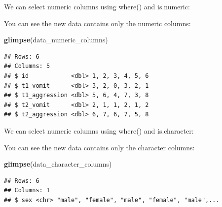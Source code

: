 \documentclass[
]{krantz}
\makeatletter
\newenvironment{Shaded}{\begin{snugshade}}{\end{snugshade}}
\newcommand{\KeywordTok}[1]{\textcolor[rgb]{0.27,0.27,0.27}{\textbf{#1}}}
\newcommand{\NormalTok}[1]{#1}
\newcommand{\OperatorTok}[1]{\textcolor[rgb]{0.43,0.43,0.43}{\textbf{#1}}}
\newcommand{\StringTok}[1]{\textcolor[rgb]{0.5,0.5,0.5}{#1}}
\newenvironment{kframe}{%
\medskip{}
\setlength{\fboxsep}{.8em}
 \def\at@end@of@kframe{}%
 \ifinner\ifhmode%
  \def\at@end@of@kframe{\end{minipage}}%
  \begin{minipage}{\columnwidth}%
 \fi\fi%
 \def\FrameCommand##1{\hskip\@totalleftmargin \hskip-\fboxsep
 \colorbox{shadecolor}{##1}\hskip-\fboxsep
     \hskip-\linewidth \hskip-\@totalleftmargin \hskip\columnwidth}%
 \MakeFramed {\advance\hsize-\width
   \@totalleftmargin\z@ \linewidth\hsize
   \@setminipage}}%
 {\par\unskip\endMakeFramed%
 \at@end@of@kframe}
\renewenvironment{Shaded}{\begin{kframe}}{\end{kframe}}
\makeatother
\begin{document}
We can select numeric columns using where() and is.numeric:

\begin{Shaded}
\end{Shaded}

You can see the new data contains only the numeric columns:

\begin{Shaded}
\begin{Highlighting}[]
\KeywordTok{glimpse}\NormalTok{(data_numeric_columns)}
\end{Highlighting}
\end{Shaded}

\begin{verbatim}
## Rows: 6
## Columns: 5
## $ id            <dbl> 1, 2, 3, 4, 5, 6
## $ t1_vomit      <dbl> 3, 2, 0, 3, 2, 1
## $ t1_aggression <dbl> 5, 6, 4, 7, 3, 8
## $ t2_vomit      <dbl> 2, 1, 1, 2, 1, 2
## $ t2_aggression <dbl> 6, 7, 6, 7, 5, 8
\end{verbatim}

We can select numeric columns using where() and is.character:

\begin{Shaded}
\end{Shaded}

You can see the new data contains only the character columns:

\begin{Shaded}
\begin{Highlighting}[]
\KeywordTok{glimpse}\NormalTok{(data_character_columns)}
\end{Highlighting}
\end{Shaded}

\begin{verbatim}
## Rows: 6
## Columns: 1
## $ sex <chr> "male", "female", "male", "female", "male",...
\end{verbatim}
\end{document}
